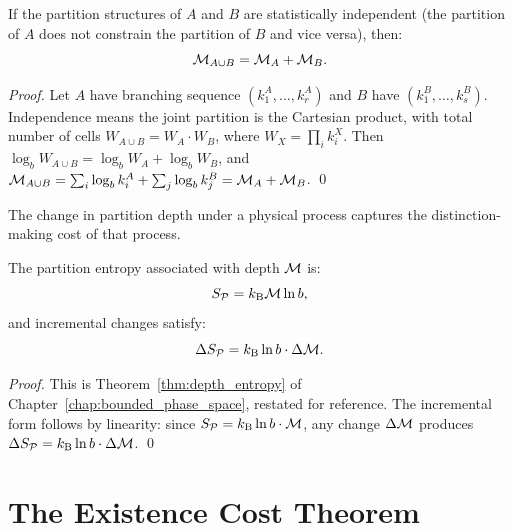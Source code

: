 \begin{proposition}
\label{prop:depth_additive}
If the partition structures of $A$ and $B$ are statistically independent
(the partition of $A$ does not constrain the partition of $B$ and vice versa),
then:
\begin{equation}
  \mathcal{M}_{A \cup B} = \mathcal{M}_A + \mathcal{M}_B.
\end{equation}
\end{proposition}

\begin{proof}
Let $A$ have branching sequence $(k_1^A, \ldots, k_r^A)$ and $B$ have
$(k_1^B, \ldots, k_s^B)$. Independence means the joint partition is the
Cartesian product, with total number of cells
$W_{A \cup B} = W_A \cdot W_B$, where $W_X = \prod_i k_i^X$.
Then $\log_b W_{A\cup B} = \log_b W_A + \log_b W_B$, and
$\mathcal{M}_{A\cup B} = \sum_i \log_b k_i^A + \sum_j \log_b k_j^B = \mathcal{M}_A + \mathcal{M}_B$. \qed
\end{proof}

The change in partition depth under a physical process captures the
distinction-making cost of that process.

\begin{theorem}
\label{thm:depth_entropy_ch3}
The partition entropy associated with depth $\mathcal{M}$ is:
\begin{equation}
  S_{\mathcal{P}} = k_{\mathrm{B}} \mathcal{M} \ln b,
  \label{eq:depth_entropy_ch3}
\end{equation}
and incremental changes satisfy:
\begin{equation}
  \Delta S_{\mathcal{P}} = k_{\mathrm{B}} \ln b \cdot \Delta\mathcal{M}.
  \label{eq:depth_entropy_delta}
\end{equation}
\end{theorem}

\begin{proof}
This is Theorem~\ref{thm:depth_entropy} of Chapter~\ref{chap:bounded_phase_space},
restated for reference. The incremental form follows by linearity: since
$S_{\mathcal{P}} = k_{\mathrm{B}} \ln b \cdot \mathcal{M}$, any change $\Delta\mathcal{M}$ produces
$\Delta S_{\mathcal{P}} = k_{\mathrm{B}} \ln b \cdot \Delta\mathcal{M}$. \qed
\end{proof}

\section{The Existence Cost Theorem}
\label{sec:existence_cost_theorem}

